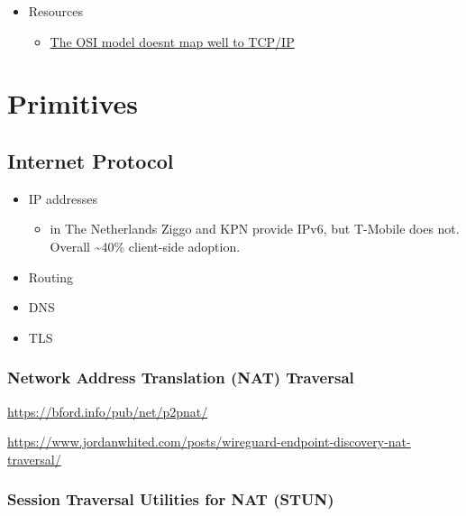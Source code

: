 \begin{itemize}
\item
  Resources

  \begin{itemize}
  \tightlist
  \item
    \href{https://jvns.ca/blog/2021/05/11/what-s-the-osi-model-/}{The
    OSI model doesn\textquotesingle t map well to TCP/IP}
  \end{itemize}
\end{itemize}

\hypertarget{primitives}{%
\section{Primitives}\label{primitives}}

\hypertarget{internet-protocol}{%
\subsection{Internet Protocol}\label{internet-protocol}}

\begin{itemize}
\item
  IP addresses

  \begin{itemize}
  \tightlist
  \item
    in The Netherlands Ziggo and KPN provide IPv6, but T-Mobile does
    not. Overall \textasciitilde40\% client-side adoption.
  \end{itemize}
\item
  Routing
\item
  DNS
\item
  TLS
\end{itemize}

\hypertarget{network-address-translation-nat-traversal}{%
\subsubsection{Network Address Translation (NAT)
Traversal}\label{network-address-translation-nat-traversal}}

\url{https://bford.info/pub/net/p2pnat/}

\url{https://www.jordanwhited.com/posts/wireguard-endpoint-discovery-nat-traversal/}

\hypertarget{session-traversal-utilities-for-nat-stun}{%
\subsubsection{Session Traversal Utilities for NAT
(STUN)}\label{session-traversal-utilities-for-nat-stun}}

